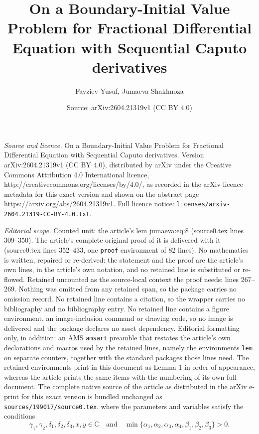 \documentclass[10pt,a4paper]{amsart}
\title{On a Boundary-Initial Value Problem for Fractional Differential Equation with Sequential Caputo derivatives}
\author{Fayziev Yusuf, Jumaeva Shakhnoza}
\date{Source: arXiv:2604.21319v1 (CC BY 4.0)}
\begin{document}
\maketitle

\noindent\emph{Source and licence.} On a Boundary-Initial Value Problem for Fractional Differential Equation with Sequential Caputo derivatives. Version arXiv:2604.21319v1 (CC BY 4.0), distributed by arXiv under the Creative Commons Attribution 4.0 International licence, http://creativecommons.org/licenses/by/4.0/, as recorded in the arXiv licence metadata for this exact version and shown on the abstract page https://arxiv.org/abs/2604.21319v1. Full licence notice: \texttt{licenses/arxiv-2604.21319-CC-BY-4.0.txt}.\par\smallskip

\noindent\textit{Editorial scope.} Counted unit: the article's lem jumaeva:eq:8 (source0.tex lines 309--350). The article's complete original proof of it is delivered with it (source0.tex lines 352--433, one \texttt{proof} environment of 82 lines). No mathematics is written, repaired or re-derived: the statement and the proof are the article's own lines, in the article's own notation, and no retained line is substituted or re-flowed.  Retained uncounted as the source-local context the proof needs: lines 267--269.  Nothing was omitted from any retained span, so the package carries no omission record.  No retained line contains a citation, so the wrapper carries no bibliography and no bibliography entry.  No retained line contains a figure environment, an image-inclusion command or drawing code, so no image is delivered and the package declares no asset dependency.  Editorial formatting only, in addition: an AMS \texttt{amsart} preamble that restates the article's own declarations and macros used by the retained lines, namely the environments \texttt{lem} on separate counters, together with the standard packages those lines need.  The retained environments print in this document as Lemma 1 in order of appearance, whereas the article prints the same items with the numbering of its own full document.  The complete native source of the article as distributed in the arXiv e-print for this exact version is bundled unchanged as \texttt{sources/199017/source0.tex}.
where the parameters and variables satisfy the conditions \begin{equation*}
\gamma_1, \gamma_2, \delta_1, \delta_2, \delta_3, x, y \in \mathbb{C} \quad \text{and} \quad \min\{\alpha_1, \alpha_2, \alpha_3, \alpha_4, \beta_1, \beta_2, \beta_3\} > 0.
\end{equation*} \label{jumaeva:def:3}
\end{document}
